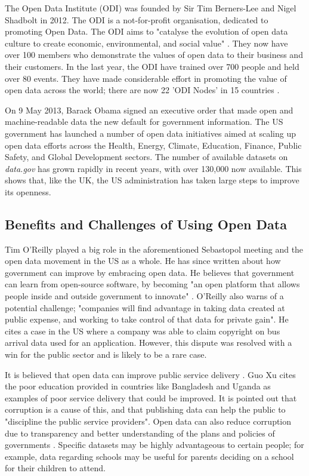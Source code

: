 \documentclass[authoryearcitations]{UoYCSproject}
\begin{document}
The Open Data Institute (ODI) was founded by Sir Tim Berners-Lee and Nigel Shadbolt in 2012. The ODI is a not-for-profit organisation, dedicated to promoting Open Data. The ODI aims to "catalyse the evolution of open data culture to create economic, environmental, and social value" \citep{TheOpenDataInstitute}. They now have over 100 members who demonstrate the values of open data to their business and their customers. In the last year, the ODI have trained over 700 people and held over 80 events. They have made considerable effort in promoting the value of open data across the world; there are now 22 'ODI Nodes' in 15 countries \citep{TheOpenDataInstitute2015a}.

On 9 May 2013, Barack Obama signed an executive order \citep{TheWhiteHouse-OfficeofthePressSecretary2013} that made open and machine-readable data the new default for government information. The US government has launched a number of open data initiatives aimed at scaling up open data efforts across the Health, Energy, Climate, Education, Finance, Public Safety, and Global Development sectors. The number of available datasets on \textit{data.gov} has grown rapidly in recent years, with over 130,000 now available. This shows that, like the UK, the US administration has taken large steps to improve its openness.

\subsection{Benefits and Challenges of Using Open Data}


Tim O'Reilly played a big role in the aforementioned Sebastopol meeting and the open data movement in the US as a whole. He has since written about how government can improve by embracing open data.  He believes that government can learn from open-source software, by becoming "an open platform that allows people inside and outside government to innovate" \citep{OReilly2011}. O'Reilly also warns of a potential challenge; "companies will find advantage in taking data created at public expense, and working to take control of that data for private gain". He cites a case in the US where a company was able to claim copyright on bus arrival data used for an application. However, this dispute was resolved with a win for the public sector and is likely to be a rare case.

It is believed that open data can improve public service delivery \citep{Xu2012}. Guo Xu cites the poor education provided in countries like Bangladesh and Uganda as examples of poor service delivery that could be improved. It is pointed out that corruption is a cause of this, and that publishing data can help the public to "discipline the public service providers". Open data can also reduce corruption due to transparency and better understanding of the plans and policies of governments \citep{Vathana}. Specific datasets may be highly advantageous to certain people; for example, data regarding schools may be useful for parents deciding on a school for their children to attend. 
\end{document}
